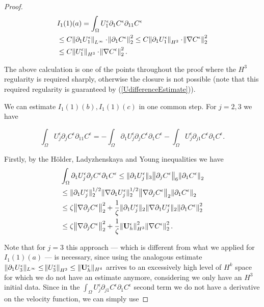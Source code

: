 \documentclass[11pt]{article}
\begin{document}
\begin{proof}
\begin{equation}
\begin{split}
& I_1(1)(a) = \int_\Omega U_1^\epsilon \partial_1 C^\epsilon \partial_{11} C^\epsilon \\
& \leq C \norm{\partial_1 U_1^\epsilon}_{L^\infty} \cdot \norm{\partial_1 C^\epsilon}_2^2 \leq C \norm{\partial_1 U_1^\epsilon}_{H^2} \cdot \norm{\nabla C^\epsilon}_2^2 \\
& \leq C \norm{U_1^\epsilon}_{H^3} \cdot \norm{\nabla C^\epsilon}_2^2.
\end{split}
\end{equation}

The above calculation is one of the points throughout the proof where the $H^3$ regularity is required sharply, otherwise the closure is not possible (note that this required regularity is guaranteed by (\ref{UdifferenceEstimate})).

We can estimate $I_1(1)(b), I_1(1)(c)$ in one common step. For $j = 2,3$ we have

$$ \int_\Omega U_j^\epsilon \partial_j C^\epsilon \partial_{11} C^\epsilon = - \int_\Omega \partial_1 U_j^\epsilon \partial_j C^\epsilon \partial_1 C^\epsilon - \int_\Omega U_j^\epsilon \partial_{j1} C^\epsilon \partial_1 C^\epsilon.$$

Firstly, by the H\"older, Ladyzhenskaya and Young inequalities we have
\begin{equation}
\begin{split}
& \int_\Omega \partial_1 U_j^\epsilon \partial_j C^\epsilon \partial_1 C^\epsilon \leq \| \partial_1 U_j^\epsilon \| _3 \norm{\partial_j C^\epsilon}_6 \norm{\partial_1 C^\epsilon}_2 \\
& \leq \| \partial_1 U_j^\epsilon \|_2^{1/2} \|\nabla \partial_1 U_j^\epsilon \|_2^{1/2} \norm{\nabla \partial_j C^\epsilon}_2 \norm{\partial_1 C^\epsilon}_2 \\
& \leq \zeta \norm{\nabla \partial_j C^\epsilon}_2^2 + \frac{1}{\zeta} \| \partial_1 U_j^\epsilon \|_2 \|\nabla \partial_1 U_j^\epsilon \|_2 \norm{\partial_1 C^\epsilon}_2^2 \\
& \leq \zeta \norm{\nabla \partial_j C^\epsilon}_2^2 + \frac{1}{\zeta} \norm{\mathbf{U}_h^\epsilon}_{H^3}^2 \norm{\nabla C^\epsilon}_2^2.
\end{split}
\end{equation}

Note that for $j=3$ this approach --- which is different from what we applied for $I_1(1)(a)$ --- is necessary, since using the analogous estimate $\| \partial_1 U_3^\epsilon \| _ {L^\infty} \leq \norm{U_3^\epsilon}_{H^3} \leq \| \mathbf{U}_h^\epsilon \| _{H^4}$ arrives to an excessively high level of $H^k$ space for which we do not have an estimate anymore, considering we only have an $H^3$ initial data. Since in the $\int_\Omega U_j^\epsilon \partial_{j1} C^\epsilon \partial_1 C^\epsilon$ second term we do not have a derivative on the velocity function, we can simply use


\end{proof}
\end{document}

